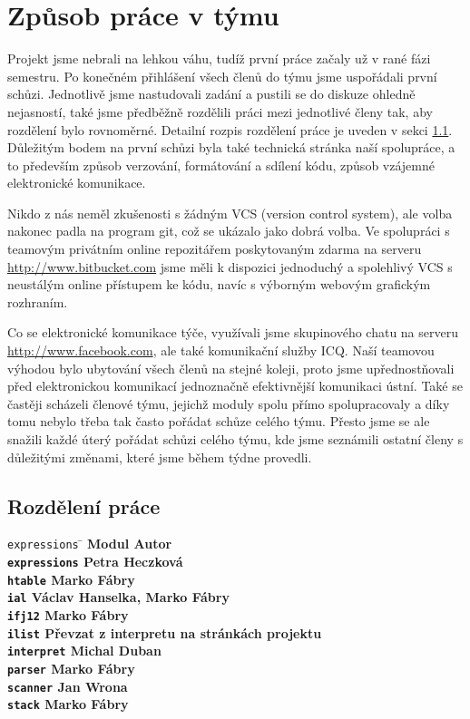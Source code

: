 \documentclass[a4paper, 12pt]{article}[5.12.2012]
\begin{document}
\section{Způsob práce v týmu} \label{s:teamwork}
Projekt jsme nebrali na lehkou váhu, tudíž první práce začaly už v rané fázi semestru. Po konečném přihlášení
všech členů do týmu jsme uspořádali první schůzi. Jednotlivě jsme nastudovali zadání a pustili se do diskuze ohledně
nejasností, také jsme předběžně rozdělili práci mezi jednotlivé členy tak, aby rozdělení bylo rovnoměrné. Detailní
rozpis rozdělení práce je uveden v sekci \ref{ss:rozdeleni}.  Důležitým bodem na první schůzi byla také technická
stránka naší spolupráce, a to především způsob verzování, formátování a sdílení kódu, způsob vzájemné elektronické komunikace.

Nikdo z nás neměl zkušenosti s žádným VCS (version control system), ale volba nakonec padla na program git, což se ukázalo
jako dobrá volba. Ve spolupráci s teamovým privátním online repozitářem poskytovaným zdarma na serveru
\url{http://www.bitbucket.com} jsme měli k dispozici jednoduchý a spolehlivý VCS s neustálým online přístupem
ke kódu, navíc s výborným webovým grafickým rozhraním.

Co se elektronické komunikace týče, využívali jsme skupinového chatu na serveru \url{http://www.facebook.com},
ale také komunikační služby ICQ. Naší teamovou výhodou bylo ubytování všech členů na stejné koleji, proto jsme
upřednostňovali před elektronickou komunikací jednoznačně efektivnější komunikaci ústní. Také se častěji 
scházeli členové týmu, jejichž moduly spolu přímo spolupracovaly a díky tomu nebylo třeba tak často pořádat
schůze celého týmu. Přesto jsme se ale snažili každé úterý pořádat schůzi celého týmu, kde jsme
seznámili ostatní členy s důležitými změnami, které jsme během týdne provedli.
\subsection{Rozdělení práce} \label{ss:rozdeleni}
\begin{tabbing}
\texttt{expressions} \quad \= \kill
\bf{Modul} \>  \bf{Autor} \\
\texttt{expressions} \> Petra Heczková\\
\texttt{htable} \> Marko Fábry\\
\texttt{ial} \> Václav Hanselka, Marko Fábry\\
\texttt{ifj12} \> Marko Fábry\\
\texttt{ilist} \> Převzat z interpretu\cite{b:interpret} na stránkách projektu\\
\texttt{interpret} \> Michal Duban\\
\texttt{parser} \> Marko Fábry\\
\texttt{scanner} \> Jan Wrona\\
\texttt{stack} \> Marko Fábry
\end{tabbing}
\end{document}
